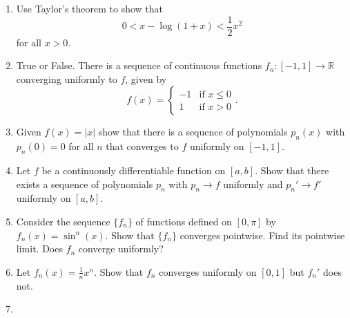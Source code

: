 \documentclass[11pt,letterpaper]{report}
\newcommand{\reals}{\mathbb{R}}
\begin{document}
\begin{enumerate}
	\item Use Taylor's theorem to show that
	\[
	0<x-\log(1+x)<\frac{1}{2}x^2
	\]
	for all $x>0$.
	\vfill
	\item True or False. There is a sequence of continuous functions $f_n:[-1, 1]\to \reals$ converging uniformly to $f$, given by
	\[
	f(x) = \begin{cases}
		-1&\text{if }x\leq 0\\
		1&\text{if }x>0
	\end{cases}.
	\]
	\vfill
	\item Given $f(x) = |x|$ show that there is a sequence of polynomials $p_n(x)$ with $p_n(0) = 0$ for all $n$ that converges to $f$ uniformly on $[-1,1]$.
	\vfill
	\item Let $f$ be a continuously differentiable function on $[a,b]$. Show that there exists a sequence of polynomials $p_n$ with $p_n\to f$ uniformly and $p_n'\to f'$ uniformly on $[a,b]$.
	\vfill
	\item Consider the sequence $\{f_n\}$ of functions defined on $[0,\pi]$ by $f_n(x) = \sin^n(x)$. Show that $\{f_n\}$ converges pointwise. Find its pointwise limit. Does $f_n$ converge uniformly?
	\vfill\null\pagebreak

	\item Let $f_n(x) = \frac{1}{n}x^n$. Show that $f_n$ converges uniformly on $[0,1]$ but $f_n'$ does not.
	\vfill

	\item 
\end{enumerate}
\end{document}
